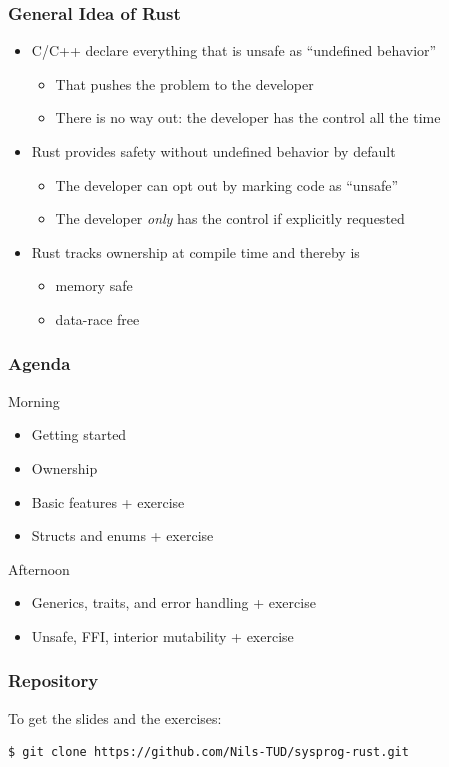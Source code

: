 \begin{frame}
    \frametitle{General Idea of Rust}

    \begin{itemize}
        \item C/C++ declare everything that is unsafe as ``undefined behavior''
        \begin{itemize}
            \item That pushes the problem to the developer
            \item There is no way out: the developer has the control all the time
        \end{itemize}

        \pause

        \item Rust provides safety without undefined behavior by default
        \begin{itemize}
            \item The developer can opt out by marking code as ``unsafe''
            \item The developer \emph{only} has the control if explicitly requested
        \end{itemize}

        \pause

        \item Rust tracks ownership at compile time and thereby is
        \begin{itemize}
            \item memory safe
            \item data-race free
        \end{itemize}
    \end{itemize}
\end{frame}

\begin{frame}
    \frametitle{Agenda}

    \begin{block}{Morning}
    \begin{itemize}
        \item Getting started
        \item Ownership
        \item Basic features + exercise
        \item Structs and enums + exercise
    \end{itemize}
    \end{block}

    \pause

    \begin{block}{Afternoon}
    \begin{itemize}
        \item Generics, traits, and error handling + exercise
        \item Unsafe, FFI, interior mutability + exercise
    \end{itemize}
    \end{block}
\end{frame}

\begin{frame}[fragile]
    \frametitle{Repository}

    \Large
    To get the slides and the exercises:
    \begin{lstlisting}[language=bash,basicstyle=\large\ttfamily]
    $ git clone https://github.com/Nils-TUD/sysprog-rust.git
    \end{lstlisting}
\end{frame}
